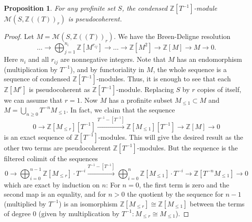 \documentclass[11pt]{amsbook}
\numberwithin{equation}{section}
\numberwithin{theorem}{section}
\newtheorem{proposition}[theorem]{Proposition}
\theoremstyle{definition}
\begin{document}
\begin{proposition}\label{prop:liquidpseudocoh} For any profinite set $S$, the condensed $\mathbb Z[T^{-1}]$-module $\mathcal M(S,\mathbb Z((T))_r)$ is pseudocoherent.
\end{proposition}

\begin{proof} Let $M=\mathcal M(S,\mathbb Z((T))_r)$. We have the Breen-Deligne resolution
\[
\ldots\to \bigoplus_{j=1}^{n_i} \mathbb Z[M^{r_{ij}}]\to\ldots\to \mathbb Z[M^2]\to \mathbb Z[M]\to M\to 0.
\]
Here $n_i$ and all $r_{ij}$ are nonnegative integers. Note that $M$ has an endomorphism (multiplication by $T^{-1}$), and by functoriality in $M$, the whole sequence is a sequence of condensed $\mathbb Z[T^{-1}]$-modules. Thus, it is enough to see that each $\mathbb Z[M^r]$ is pseudocoherent as $\mathbb Z[T^{-1}]$-module. Replacing $S$ by $r$ copies of itself, we can assume that $r=1$. Now $M$ has a profinite subset $M_{\leq 1}\subset M$ and $M=\bigcup_{n\geq 0} T^{-n} M_{\leq 1}$. In fact, we claim that the sequence
\[
0\to \mathbb Z[M_{\leq r}][T^{-1}]\xrightarrow{T^{-1}-[T^{-1}]}\mathbb Z[M_{\leq 1}][T^{-1}]\to \mathbb Z[M]\to 0
\]
is an exact sequence of $\mathbb Z[T^{-1}]$-modules. This will give the desired result as the other two terms are pseudocoherent $\mathbb Z[T^{-1}]$-modules. But the sequence is the filtered colimit of the sequences
\[
0\to \bigoplus_{i=0}^{n-1} \mathbb Z[M_{\leq r}]\cdot T^{-i}\xrightarrow{T^{-1}-[T^{-1}]}\bigoplus_{i=0}^{n} \mathbb Z[M_{\leq 1}]\cdot T^{-i}\to \mathbb Z[T^{-n} M_{\leq 1}]\to 0
\]
which are exact by induction on $n$: For $n=0$, the first term is zero and the second map is an equality, and for $n>0$ the quotient by the sequence for $n-1$ (multiplied by $T^{-1}$) is an isomorphism $\mathbb Z[M_{\leq r}]\cong \mathbb Z[M_{\leq 1}]$ between the terms of degree $0$ (given by multiplication by $T^{-1}: M_{\leq r}\cong M_{\leq 1}$).
\end{proof}
\end{document}
